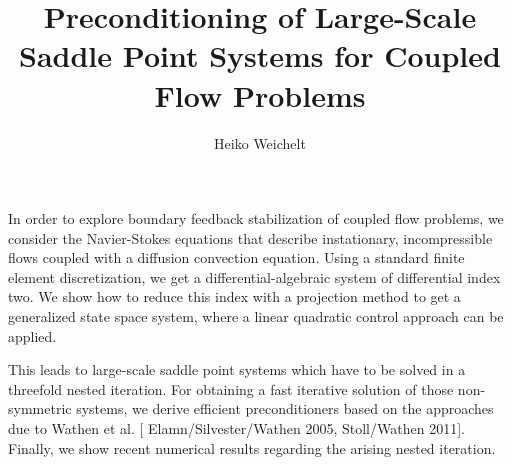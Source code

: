 \documentclass{article}
\title{Preconditioning of Large-Scale Saddle Point Systems
  for Coupled Flow Problems}
\author{Heiko Weichelt}
\affil{PhD student at Max Planck Institute for Dynamics of Complex
    Technical Systems Magdeburg, Germany}
\date{}
\begin{document}
\maketitle
\setcounter{page}{7}
In order to explore boundary feedback stabilization of coupled flow
problems, we consider the Navier-Stokes equations that describe
instationary, incompressible flows coupled with a diffusion convection
equation. Using a standard finite element discretization, we get a
differential-algebraic system of differential index two. We show how
to reduce this index with a projection method to get a generalized
state space system, where a linear quadratic control approach can be
applied.

This leads to large-scale saddle point systems which have to be solved
in a threefold nested iteration. For obtaining a fast iterative
solution of those non-symmetric systems, we derive efficient
preconditioners based on the approaches due to Wathen et al. [{\sc
  Elamn/Silvester/Wathen 2005, Stoll/Wathen 2011}]. Finally, we show
recent numerical results regarding the arising nested iteration.
\end{document}
